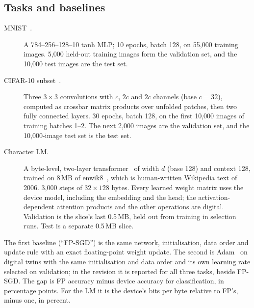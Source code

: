 \subsection{Tasks and baselines}\label{sec:tasks}
\begin{description}
\item[MNIST~\cite{lecun1998}.] A 784--256--128--10 tanh MLP; 10 epochs, batch 128, on 55{,}000 training images. 5{,}000 held-out
      training images form the validation set, and the 10{,}000 test images are the test set.
\item[CIFAR-10 subset~\cite{krizhevsky2009}.] Three $3\times3$ convolutions with $c$, $2c$ and $2c$ channels (base $c=32$),
      computed as crossbar matrix products over unfolded patches, then two fully connected layers. 30 epochs, batch 128, on the
      first 10{,}000 images of training batches 1--2. The next 2{,}000 images are the validation set, and the 10{,}000-image
      test set is the test set.
\item[Character LM.] A byte-level, two-layer transformer~\cite{vaswani2017} of width $d$ (base 128) and context 128, trained on
      8\,MB of enwik8~\cite{mahoney2011}, which is human-written Wikipedia text of 2006. 3{,}000 steps of $32\times128$ bytes.
      Every learned weight matrix uses the device model, including the embedding and the head; the activation-dependent
      attention products and the other operations are digital. Validation is the slice's last 0.5\,MB, held out from
      training in selection runs. Test is a separate 0.5\,MB slice.
\end{description}
The first baseline (``FP-SGD'') is the same network, initialisation, data order and update rule with an exact floating-point
weight update. The second is Adam~\cite{kingma2014} on digital twins with the same initialisation and data order and its own
learning rate selected on validation; in the revision it is reported for all three tasks, beside FP-SGD. The gap is FP accuracy minus device
accuracy for classification, in percentage points. For the LM it is the device's bits per byte relative to FP's, minus one, in
percent.

